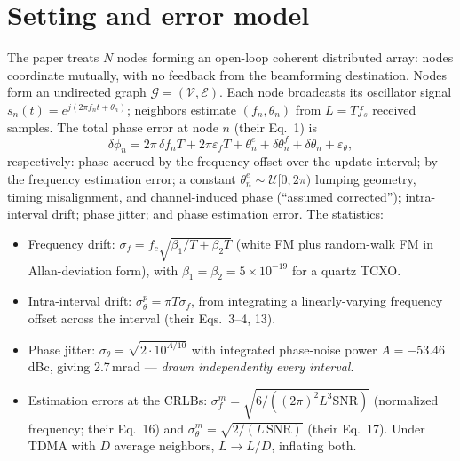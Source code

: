 \documentclass[10pt]{article}
\begin{document}
\section{Setting and error model}
The paper treats $N$ nodes forming an open-loop coherent distributed
array: nodes coordinate mutually, with no feedback from the beamforming
destination. Nodes form an undirected graph $\mathcal{G}=(\mathcal{V},
\mathcal{E})$. Each node broadcasts its oscillator signal
$s_n(t)=e^{j(2\pi f_n t+\theta_n)}$; neighbors estimate $(f_n,\theta_n)$
from $L=Tf_s$ received samples. The total phase error at node $n$ (their
Eq.~1) is
\begin{equation}
\delta\phi_n = 2\pi\,\delta\!f_n T + 2\pi\varepsilon_f T + \theta^e_n
+ \delta\theta^f_n + \delta\theta_n + \varepsilon_\theta ,
\label{eq:their1}
\end{equation}
respectively: phase accrued by the frequency offset over the update
interval; by the frequency estimation error; a constant
$\theta^e_n\sim\mathcal{U}[0,2\pi)$ lumping geometry, timing
misalignment, and channel-induced phase (``assumed corrected'');
intra-interval drift; phase jitter; and phase estimation error. The
statistics:
\begin{itemize}
\item Frequency drift: $\sigma_f=f_c\sqrt{\beta_1/T+\beta_2T}$ (white FM
plus random-walk FM in Allan-deviation form), with
$\beta_1=\beta_2=5\times10^{-19}$ for a quartz TCXO.
\item Intra-interval drift: $\sigma^p_\theta=\pi T\sigma_f$, from
integrating a linearly-varying frequency offset across the interval
(their Eqs.~3--4, 13).
\item Phase jitter: $\sigma_\theta=\sqrt{2\cdot10^{A/10}}$ with
integrated phase-noise power $A=-53.46$\,dBc, giving 2.7\,mrad ---
\emph{drawn independently every interval}.
\item Estimation errors at the CRLBs: $\sigma^m_f=\sqrt{6/((2\pi)^2L^3
\mathrm{SNR})}$ (normalized frequency; their Eq.~16) and
$\sigma^m_\theta=\sqrt{2/(L\,\mathrm{SNR})}$ (their Eq.~17). Under TDMA
with $D$ average neighbors, $L\to L/D$, inflating both.
\end{itemize}
\end{document}
